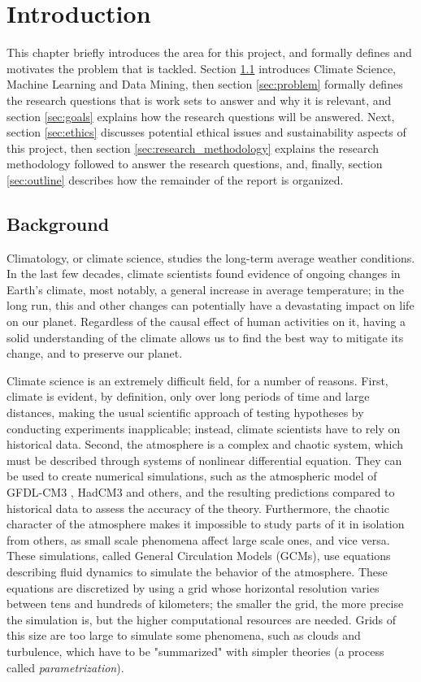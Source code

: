 \documentclass[a4paper,11pt]{kth-mag}
\begin{document}
\mainmatter
\pagestyle{newchap}

\chapter{Introduction}
This chapter briefly introduces the area for this project, and formally defines and motivates the problem that is tackled. Section \ref{sec:intro_bg} introduces Climate Science, Machine Learning and Data Mining, then section \ref{sec:problem} formally defines the research questions that is work sets to answer and why it is relevant, and section \ref{sec:goals} explains how the research questions will be answered. Next, section \ref{sec:ethics} discusses potential ethical issues and sustainability aspects of this project, then section \ref{sec:research_methodology} explains the research methodology followed to answer the research questions, and, finally, section \ref{sec:outline} describes how the remainder of the report is organized.

\section{Background}
\label{sec:intro_bg}
Climatology, or climate science, studies the long-term average weather conditions. In the last few decades, climate scientists found evidence of ongoing changes in Earth's climate, most notably, a general increase in average temperature; in the long run, this and other changes can potentially have a devastating impact on life on our planet. Regardless of the causal effect of human activities on it, having a solid understanding of the climate allows us to find the best way to mitigate its change, and to preserve our planet.

Climate science is an extremely difficult field, for a number of reasons. First, climate is evident, by definition, only over long periods of time and large distances, making the usual scientific approach of testing hypotheses by conducting experiments inapplicable; instead, climate scientists have to rely on historical data. Second, the atmosphere is a complex and chaotic system, which must be described through systems of nonlinear differential equation. They can be used to create numerical simulations, such as the atmospheric model of GFDL-CM3 \citep{gfdl_am3}, HadCM3 \citep{hadcm3} and others, and the resulting predictions compared to historical data to assess the accuracy of the theory. Furthermore, the chaotic character of the atmosphere makes it impossible to study parts of it in isolation from others, as small scale phenomena affect large scale ones, and vice versa. These simulations, called General Circulation Models (GCMs), use equations describing fluid dynamics to simulate the behavior of the atmosphere. These equations are discretized by using a grid whose horizontal resolution varies between tens and hundreds of kilometers; the smaller the grid, the more precise the simulation is, but the higher computational resources are needed. Grids of this size are too large to simulate some phenomena, such as clouds and turbulence, which have to be "summarized" with simpler theories (a process called \emph{parametrization}).
\end{document}
